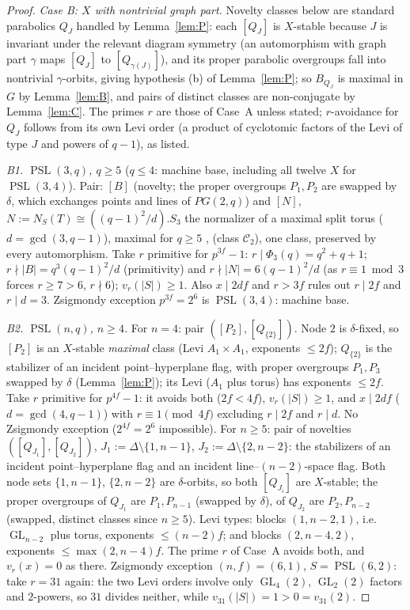 \documentclass[11pt]{amsart}
\theoremstyle{definition}
\theoremstyle{remark}
\DeclareMathOperator{\PSL}{PSL}
\DeclareMathOperator{\GL}{GL}
\newcommand{\vp}[1]{v_{#1}}
\begin{document}
\begin{proof}
\emph{Case B: $X$ with nontrivial graph part.} Novelty classes below are
standard parabolics $Q_J$ handled by Lemma~\ref{lem:P}: each $[Q_J]$ is
$X$-stable because $J$ is invariant under the relevant diagram symmetry
(an automorphism with graph part $\gamma$ maps $[Q_J]$ to
$[Q_{\gamma(J)}]$), and its proper parabolic overgroups fall into
nontrivial $\gamma$-orbits, giving hypothesis (b) of Lemma~\ref{lem:P};
so $B_{Q_J}$ is maximal in $G$ by Lemma~\ref{lem:B}, and pairs of
distinct classes are non-conjugate by Lemma~\ref{lem:C}. The primes $r$
are those of Case~A unless stated; $r$-avoidance for $Q_J$ follows from
its own Levi order (a product of cyclotomic factors of the Levi of type
$J$ and powers of $q-1$), as listed.

\emph{B1. $\PSL(3,q)$, $q\geq5$} ($q\leq4$: machine base, including all
twelve $X$ for $\PSL(3,4)$). Pair: $[B]$ (novelty; the proper overgroups
$P_1,P_2$ are swapped by $\delta$, which exchanges points and lines of
$PG(2,q)$) and $[N]$, $N:=N_S(T)\cong((q-1)^2/d).S_3$ the normalizer of
a maximal split torus ($d=\gcd(3,q-1)$), maximal for $q\geq5$
\cite{Mitchell1911,Hartley1925}, \cite[Table~8.3]{BHRD} (class
$\mathcal{C}_2$), one class, preserved by every automorphism. Take
$r$ primitive for $p^{3f}-1$: $r\mid\Phi_3(q)=q^2+q+1$; $r\nmid|B|=
q^3(q-1)^2/d$ (primitivity) and $r\nmid|N|=6(q-1)^2/d$ (as
$r\equiv1\bmod3$ forces $r\geq7>6$, $r\nmid6$); $\vp{r}(|S|)\geq1$.
Also $x\mid2df$ and $r>3f$ rules out $r\mid2f$ and $r\mid d=3$.
Zsigmondy exception $p^{3f}=2^6$ is $\PSL(3,4)$: machine base.

\emph{B2. $\PSL(n,q)$, $n\geq4$.} For $n=4$: pair $([P_2],[Q_{\{2\}}])$.
Node $2$ is $\delta$-fixed, so $[P_2]$ is an $X$-stable \emph{maximal}
class (Levi $A_1{\times}A_1$, exponents $\leq2f$); $Q_{\{2\}}$ is the
stabilizer of an incident point--hyperplane flag, with proper overgroups
$P_1,P_3$ swapped by $\delta$ (Lemma~\ref{lem:P}); its Levi ($A_1$ plus
torus) has exponents $\leq2f$. Take $r$ primitive for $p^{4f}-1$: it
avoids both ($2f<4f$), $\vp{r}(|S|)\geq1$, and $x\mid2df$
($d=\gcd(4,q-1)$) with $r\equiv1\pmod{4f}$ excluding $r\mid2f$ and
$r\mid d$. No Zsigmondy exception ($2^{4f}=2^6$ impossible).
For $n\geq5$: pair of novelties $([Q_{J_1}],[Q_{J_2}])$,
$J_1:=\Delta\setminus\{1,n{-}1\}$, $J_2:=\Delta\setminus\{2,n{-}2\}$:
the stabilizers of an incident point--hyperplane flag and an incident
line--$(n{-}2)$-space flag. Both node sets $\{1,n{-}1\}$, $\{2,n{-}2\}$
are $\delta$-orbits, so both $[Q_{J_i}]$ are $X$-stable; the proper
overgroups of $Q_{J_1}$ are $P_1,P_{n-1}$ (swapped by $\delta$), of
$Q_{J_2}$ are $P_2,P_{n-2}$ (swapped, distinct classes since $n\geq5$).
Levi types: blocks $(1,n{-}2,1)$, i.e.\ $\GL_{n-2}$ plus torus,
exponents $\leq(n{-}2)f$; and blocks $(2,n{-}4,2)$, exponents
$\leq\max(2,n{-}4)f$. The prime $r$ of Case~A avoids both, and
$\vp{r}(x)=0$ as there. Zsigmondy exception $(n,f)=(6,1)$,
$S=\PSL(6,2)$: take $r=31$ again: the two Levi orders involve only
$\GL_4(2)$, $\GL_2(2)$ factors and $2$-powers, so $31$ divides neither,
while $v_{31}(|S|)=1>0=v_{31}(2)$.


\end{proof}
\end{document}
